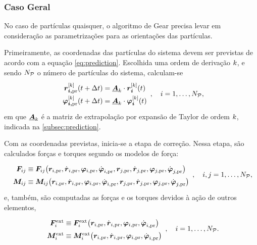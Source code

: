 \subsubsection*{Caso Geral}

No caso de partículas quaisquer, o algoritmo de Gear precisa levar em consideração as parametrizações para as orientações das partículas.

Primeiramente, as coordenadas das partículas do sistema devem ser previstas de acordo com a equação \eqref{eq:prediction}. Escolhida uma ordem de derivação \(k\), e sendo \(N_{\mathcal{P}}\) o número de partículas do sistema, calculam-se
\begin{equation*}
	\def\arraystretch{1.5}
	\begin{array}{c}
		\drvec{\taylorOrder}{\positionipr}\pqty{t+\Dt} = \extrapolationMatrix{\taylorOrder}\cdot\drvec{\taylorOrder}{\positioni}\pqty{t} \\
		\drvec{\taylorOrder}{\orientationipr}\pqty{t+\Dt} = \extrapolationMatrix{\taylorOrder}\cdot\drvec{\taylorOrder}{\orientationi}\pqty{t} \\
	\end{array}, \quad i = 1, \dots, \numberOfParticles,
\end{equation*}
em que \(\underline{\bm{A}}_{k}\) é a matriz de extrapolação por expansão de Taylor de ordem \(k\), indicada na \autoref{subsec:prediction}.

Com as coordenadas previstas, inicia-se a etapa de correção. Nessa etapa, são calculados forças e torques segundo os modelos de força:
\begin{equation*}
	\def\arraystretch{1.5}
	\begin{array}{c}
		\forceij \equiv \forceij\pqty{\positionipr, \velocityipr, \orientationipr, \dorientationipr{1}, \positionjpr, \velocityjpr, \orientationjpr, \dorientationjpr{1}} \\
		\torqueij \equiv \torqueij\pqty{\positionipr, \velocityipr, \orientationipr, \dorientationipr{1}, \positionjpr, \velocityjpr, \orientationjpr, \dorientationjpr{1}}
	\end{array}, \quad i,j = 1, \dots, \numberOfParticles,
\end{equation*}
e, também, são computadas as forças e os torques devidos à ação de outros elementos,
\begin{equation*}
	\def\arraystretch{1.5}
	\begin{array}{c}
		\external\forcei \equiv \external\forcei\pqty{\positionipr, \velocityipr, \orientationipr, \dorientationipr{1}} \\
		\external\torquei \equiv \external\torquei\pqty{\positionipr, \velocityipr, \orientationipr, \dorientationipr{1}} \\
	\end{array}, \quad i = 1, \dots, \numberOfParticles.
\end{equation*}
\begin{equation*}
\end{equation*}

